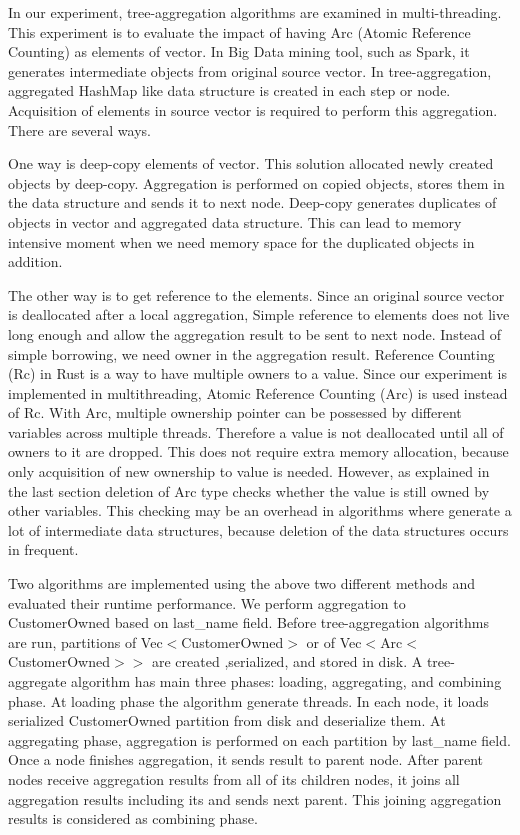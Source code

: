 In our experiment, tree-aggregation algorithms are examined in multi-threading. This experiment is to evaluate the impact of having Arc (Atomic Reference Counting) as elements of vector. 
In Big Data mining tool, such as Spark, it generates intermediate objects from original source vector. In tree-aggregation, aggregated HashMap like data structure is created in each step or node. 
Acquisition of elements in source vector is required to perform this aggregation. There are several ways.

One way is deep-copy elements of vector. This solution allocated newly created objects by deep-copy. 
Aggregation is performed on copied objects, stores them in the data structure and sends it to next node. 
Deep-copy generates duplicates of objects in vector and aggregated data structure. 
This can lead to memory intensive moment when we need memory space for the duplicated objects in addition.

The other way is to get reference to the elements. Since an original source vector is deallocated after a local aggregation,
Simple reference to elements does not live long enough and allow the aggregation result to be sent to next node. 
Instead of simple borrowing, we need owner in the aggregation result. Reference Counting (Rc) in Rust is a way to have multiple owners to a value. 
Since our experiment is implemented in multithreading, Atomic Reference Counting (Arc) is used instead of Rc. With Arc, multiple ownership pointer can be 
possessed by different variables across multiple threads. Therefore a value is not deallocated until all of owners to it are dropped. 
This does not require extra memory allocation, because only acquisition of new ownership to value is needed. 
However, as explained in the last section deletion of Arc type checks whether the value is still owned by other variables. 
This checking may be an overhead in algorithms where generate a lot of intermediate data structures, because deletion of the data structures occurs in frequent.

Two algorithms are implemented using the above two different methods and evaluated their runtime performance. 
We perform aggregation to CustomerOwned based on last\_name field. 
Before tree-aggregation algorithms are run, partitions of Vec$<$CustomerOwned$>$ or of Vec$<$Arc$<$CustomerOwned$>>$ are created ,serialized, and stored in disk.
A tree-aggregate algorithm has main three phases: loading, aggregating, and combining phase. 
At loading phase the algorithm generate threads. In each node, it loads serialized CustomerOwned partition from disk and deserialize them.
At aggregating phase, aggregation is performed on each partition by last\_name field. Once a node finishes aggregation, it sends result to parent node. 
After parent nodes receive aggregation results from all of its children nodes, it joins all aggregation results including its and sends next parent. 
This joining aggregation results is considered as combining phase. 

